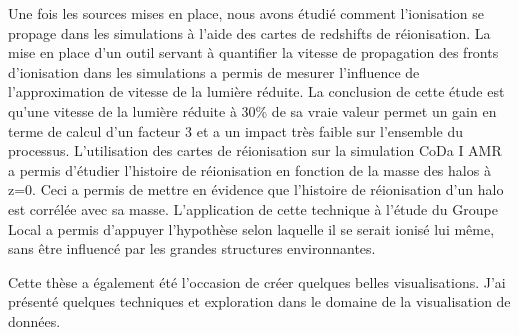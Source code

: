 Une fois les sources mises en place, nous avons étudié comment l'ionisation se propage dans les simulations à l'aide des cartes de redshifts de réionisation.
La mise en place d'un outil servant à quantifier la vitesse de propagation des fronts d'ionisation dans les simulations a permis de mesurer l'influence de l'approximation de vitesse de la lumière réduite.
La conclusion de cette étude est qu'une vitesse de la lumière réduite à 30\% de sa vraie valeur permet un gain en terme de calcul d'un facteur 3 et a un impact très faible sur l'ensemble du processus.
L'utilisation des cartes de réionisation sur la simulation CoDa I AMR a permis d'étudier l'histoire de réionisation en fonction de la masse des halos à z=0.
Ceci a permis de mettre en évidence que l'histoire de réionisation d'un halo est corrélée avec sa masse.%
L'application de cette technique à l'étude du Groupe Local a permis d'appuyer l'hypothèse selon laquelle il se serait ionisé lui même, sans être influencé par les grandes structures environnantes.



Cette thèse a également été l'occasion de créer quelques belles visualisations. %
J'ai présenté quelques techniques et exploration dans le domaine de la visualisation de données.




